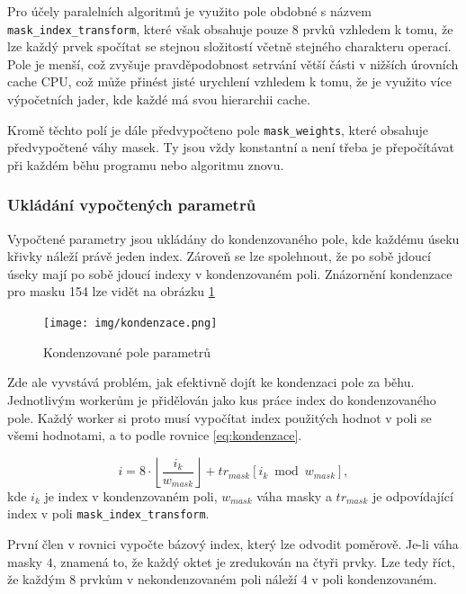 \documentclass[]{thesiskiv}
\begin{document}
Pro účely paralelních algoritmů je využito pole obdobné s názvem\\ \texttt{mask\_index\_transform}, které však obsahuje pouze $8$ prvků vzhledem k tomu, že lze každý prvek spočítat se stejnou složitostí včetně stejného charakteru operací. Pole je menší, což zvyšuje pravděpodobnost setrvání větší části v nižších úrovních cache CPU, což může přinést jisté urychlení vzhledem k tomu, že je využito více výpočetních jader, kde každé má svou hierarchii cache.

Kromě těchto polí je dále předvypočteno pole \texttt{mask\_weights}, které obsahuje předvypočtené váhy masek. Ty jsou vždy konstantní a není třeba je přepočítávat při každém běhu programu nebo algoritmu znovu.

\subsubsection*{Ukládání vypočtených parametrů}

Vypočtené parametry jsou ukládány do kondenzovaného pole, kde každému úseku křivky náleží právě jeden index. Zároveň se lze spolehnout, že po sobě jdoucí úseky mají po sobě jdoucí indexy v kondenzovaném poli. Znázornění kondenzace pro masku 154 lze vidět na obrázku \ref{img:kond}

\begin{figure}[ht]
	\centering
	\texttt{[image: img/kondenzace.png]}
	\caption{Kondenzované pole parametrů}\label{img:kond}
\end{figure}

Zde ale vyvstává problém, jak efektivně dojít ke kondenzaci pole za běhu. Jednotlivým workerům je přidělován jako kus práce index do kondenzovaného pole. Každý worker si proto musí vypočítat index použitých hodnot v poli se všemi hodnotami, a to podle rovnice \ref{eq:kondenzace}.

\begin{equation}\label{eq:kondenzace}
i = 8 \cdot\left\lfloor\frac{i_{k}}{w_{mask}}\right\rfloor + tr_{mask}[i_{k} \bmod w_{mask}],
\end{equation}
kde $i_{k}$ je index v kondenzovaném poli, $w_{mask}$ váha masky a $tr_{mask}$ je odpovídající index v poli \texttt{mask\_index\_transform}.

První člen v rovnici vypočte bázový index, který lze odvodit poměrově. Je-li váha masky $4$, znamená to, že každý oktet je zredukován na čtyři prvky. Lze tedy říct, že každým $8$ prvkům v nekondenzovaném poli náleží $4$ v poli kondenzovaném.
\end{document}

